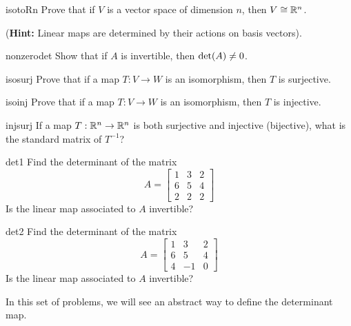 \begin{problem}{isotoRn}
    Prove that if $V$ is a vector space of dimension $n$, then $V \cong \mathbb{R}^n$.  
    
    (\textbf{Hint:} Linear maps are determined by their actions on basis vectors).
\end{problem}

\begin{problem}{nonzerodet}
    Show that if $A$ is invertible, then $\textnormal{det}(A) \neq 0$.
\end{problem}

\begin{problem}{isosurj}
    Prove that if a map $T : V \to W$ is an isomorphism, then $T$ is surjective.
\end{problem}

\begin{problem}{isoinj}
    Prove that if a map $T : V \to W$ is an isomorphism, then $T$ is injective.
\end{problem}

\begin{problem}{injsurj}
    If a map $T : \mathbb{R}^n \to \mathbb{R}^n$ is both surjective and injective (bijective), what is the standard matrix of $T^{-1}$?
\end{problem}

\begin{problem}{det1}
     Find the determinant of the matrix \begin{equation*}
A = 
\begin{bmatrix}
1 & 3 & 2 \\
6 & 5 & 4 \\
2 & 2 & 2
\end{bmatrix}
\end{equation*}
Is the linear map associated to $A$ invertible?
\end{problem}

\begin{problem}{det2}
     Find the determinant of the matrix \begin{equation*}
A = 
\begin{bmatrix}
1 & 3 & 2 \\
6 & 5 & 4 \\
4 & -1 & 0
\end{bmatrix}
\end{equation*}
Is the linear map associated to $A$ invertible?
\end{problem}


In this set of problems, we will see an abstract way to define the determinant map.  

